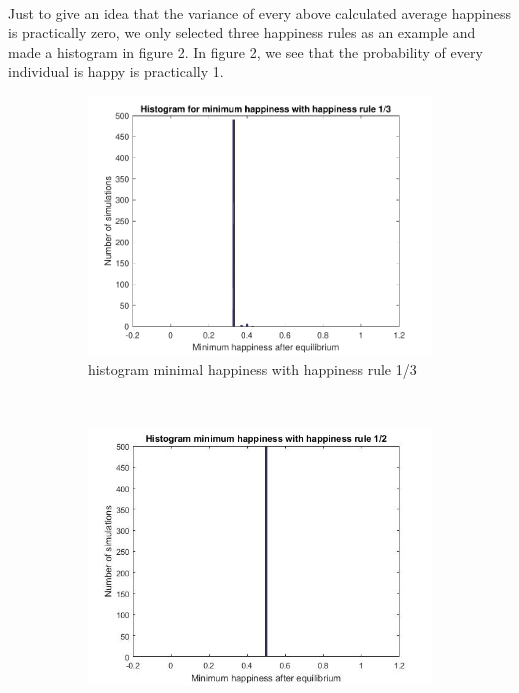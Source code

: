 \documentclass{article}
\begin{document}
\\
Just to give an idea that the variance of every above calculated average happiness is practically zero, we only selected three happiness rules as an example and made a histogram in figure 2. In figure 2, we see that the probability of every individual is happy is practically 1.
\newpage
\begin{figure}[ht]
    \centering
    \begin{subfigure}[t]{0.32\textwidth}
        \includegraphics[width=\textwidth]{histogram_min_happiness_een_derde}
        \caption{histogram minimal happiness with happiness rule 1/3}
        \label{fig:gull}
    \end{subfigure}
    ~ %
    \begin{subfigure}[t]{0.32\textwidth}
        \includegraphics[width=\textwidth]{histogram_min_happiness_half}

\end{subfigure}
\end{figure}
\end{document}
